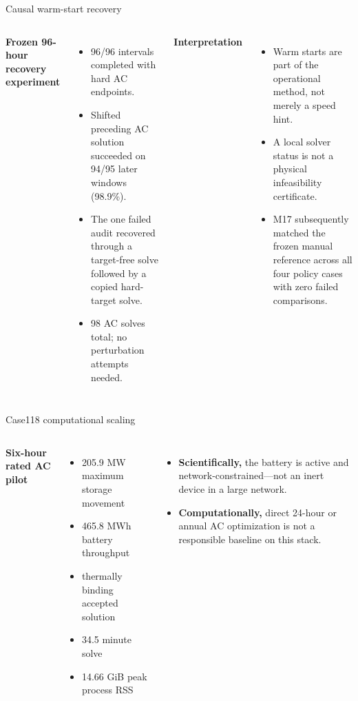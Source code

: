 \documentclass[aspectratio=169,11pt]{beamer}
\newcommand{\tightitems}{\setlength{\itemsep}{0.42em}}
\begin{document}
\begin{frame}{Causal warm-start recovery}
  \begin{columns}[T,onlytextwidth]
    \textbf{Frozen 96-hour recovery experiment}
      \begin{itemize}\tightitems
        \item 96/96 intervals completed with hard AC endpoints.
        \item Shifted preceding AC solution succeeded on 94/95 later windows (98.9\%).
        \item The one failed audit recovered through a target-free solve followed by a copied hard-target solve.
        \item 98 AC solves total; no perturbation attempts needed.
      \end{itemize}
    \textbf{Interpretation}
    \begin{itemize}\tightitems
      \item Warm starts are part of the operational method, not merely a speed hint.
      \item A local solver status is not a physical infeasibility certificate.
      \item M17 subsequently matched the frozen manual reference across all four policy cases with zero failed comparisons.
    \end{itemize}
  \end{columns}
\end{frame}

\begin{frame}{Case118 computational scaling}
  \begin{columns}[T,onlytextwidth]
    \textbf{Six-hour rated AC pilot}
      \begin{itemize}\tightitems
        \item 205.9 MW maximum storage movement
        \item 465.8 MWh battery throughput
        \item thermally binding accepted solution
        \item 34.5 minute solve
        \item 14.66 GiB peak process RSS
      \end{itemize}
    \begin{itemize}\tightitems
      \item \textbf{Scientifically,} the battery is active and network-constrained—not an inert device in a large network.
      \item \textbf{Computationally,} direct 24-hour or annual AC optimization is not a responsible baseline on this stack.
    \end{itemize}
  \end{columns}
\end{frame}
\end{document}
